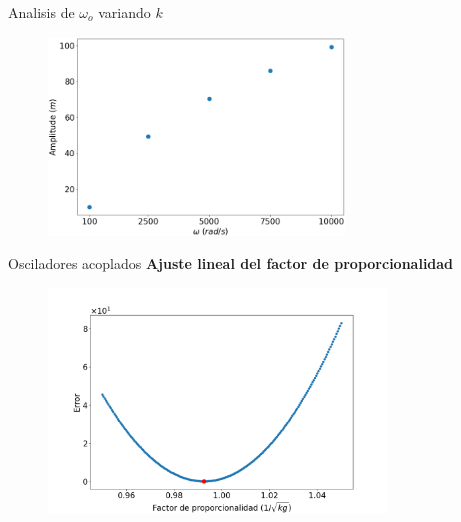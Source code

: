 \begin{frame}{Analisis de $\omega_o$ variando $k$}
        \begin{figure}[H]
            \centering
            \includegraphics[width=0.7\textwidth]{pic/05-results/w_k}
            \label{fig:w_k}
        \end{figure}
\end{frame}

\begin{frame}{Osciladores acoplados}
    \textbf{Ajuste lineal del factor de proporcionalidad}
    \begin{minipage}[c]{0.8\linewidth}
        \begin{figure}[H]
            \centering
            \includegraphics[width=0.8\textwidth]{pic/05-results/prop_error}
            \label{fig:prop-error}
        \end{figure}
    \end{minipage}
    \begin{minipage}{0.15\linewidth}
        \large{}
    \end{minipage}
\end{frame}

